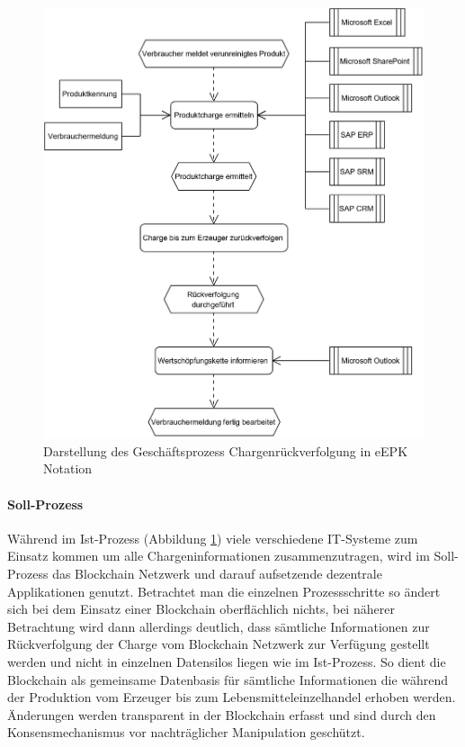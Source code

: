 \begin{figure}[H]
	\centering
	\includegraphics[width=1\linewidth]{pictures/business-process-epc-diagram-bw}
	\caption[Darstellung des Geschäftsprozess Chargenrückverfolgung in eEPK Notation]{Darstellung des Geschäftsprozess Chargenrückverfolgung in eEPK Notation}
	\label{fig:business-process-epc-diagramm}
\end{figure}

\paragraph{Soll-Prozess}
Während im Ist-Prozess (Abbildung \ref{fig:business-process-epc-diagramm}) viele verschiedene IT-Systeme zum Einsatz kommen um alle Chargeninformationen zusammenzutragen, wird im Soll-Prozess das Blockchain Netzwerk und darauf aufsetzende dezentrale Applikationen genutzt. Betrachtet man die einzelnen Prozessschritte so ändert sich bei dem Einsatz einer Blockchain oberflächlich nichts, bei näherer Betrachtung wird dann allerdings deutlich, dass sämtliche Informationen zur Rückverfolgung der Charge vom Blockchain Netzwerk zur Verfügung gestellt werden und nicht in einzelnen Datensilos liegen wie im Ist-Prozess. So dient die Blockchain als gemeinsame Datenbasis für sämtliche Informationen die während der Produktion vom Erzeuger bis zum Lebensmitteleinzelhandel erhoben werden. Änderungen werden transparent in der Blockchain erfasst und sind durch den Konsensmechanismus vor nachträglicher Manipulation geschützt. 


